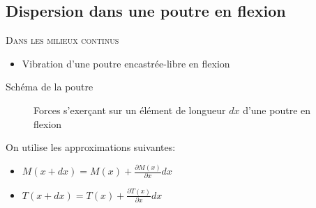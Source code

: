 \documentclass[xcolor=x11names,compress]{beamer}
\renewcommand{\(}{\begin{columns}}
\renewcommand{\)}{\end{columns}}
\newcommand{\<}[1]{\begin{column}{#1}}
\renewcommand{\>}{\end{column}}
\begin{document}

\subsection{Dispersion dans une poutre en flexion}
\begin{frame}{}


{\scshape Dans les milieux continus}
\begin{itemize}
	\item[]Vibration d'une poutre encastrée-libre en flexion
\end{itemize}
\end{frame}

\begin{frame}{Schéma de la poutre}

\begin{figure}[!h]
\caption*{ \scriptsize Forces s’exerçant sur un élément de longueur $dx$ d'une poutre en flexion}
\end{figure}

On utilise les approximations suivantes:
\begin{itemize}
\item  $M(x+dx) = M(x) + \frac{\partial M(x)}{\partial x} dx$   
\item $T(x+dx) = T(x) + \frac{\partial T(x)}{\partial x} dx$
\end{itemize}
\end{frame}
\end{document}

